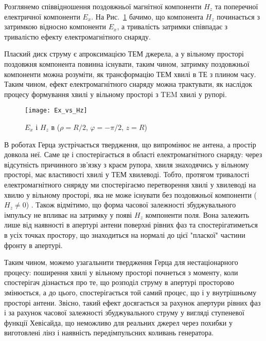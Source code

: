 Розглянемо співвідношення поздовжньої  магнітної компоненти $ H_z $ та 
поперечної електричної компоненти $ E_x $. На Рис.~\ref{fig:ex_vs_hz}
бачимо, що компонента $ H_z $ починається з затримкою відносно компоненти 
$ E_x $, а тривалість затримки співпадає з тривалістю ефекту 
електромагнітного снаряду. 

Плаский диск струму є апроксимацією ТЕМ джерела, а у вільному просторі 
поздовжня компонента повинна існувати, таким чином, затримку поздовжньої 
компоненти можна розуміти, як трансформацію ТЕМ хвилі в ТЕ з плином 
часу. Таким чином, ефект електромагнітного снаряду можна трактувати, як 
наслідок процесу формування хвилі у вільному просторі з TEM хвилі у рупорі.

\begin{figure}[h] \begin{center}
\texttt{[image: Ex\_vs\_Hz]}
\caption{$E_x$ і $H_z$ в ($\rho = R/2$, $\varphi = -\pi/2$, $z = R$)} 
\label{fig:ex_vs_hz}
\end{center} \end{figure}

В роботах Герца \cite{imp:Hertz1938} зустрічається твердження, що 
випромінює не антена, а простір довкола неї. Саме це і спостерігається в 
області електромагнітного снаряду: через відсутність причинного зв'язку з 
краєм рупора, хвиля знаходячись у вільному просторі, має властивості хвилі у 
ТЕМ хвилеводі. Тобто, протягом тривалості електромагнітного сняряду ми 
спостерігаємо перетворення хвилі у хвилеводі на хвилю у вільному просторі, 
яка не може існувати без поздовжньої компоненти ($ H_z \neq 0 $) 
\cite{imp:Borisov1991, imp:Harmuth1985}. Також відмітимо, що форма часової 
залежності збуджувального імпульсу не впливає на затримку у появі $ H_z $
компоненти поля. Вона залежить лише від наявності в апертурі антени
поверхні рівних фаз та спостерігатиметься в усіх точках простору, що 
знаходиться на нормалі до цієї "пласкої" частини фронту в апертурі.

Таким чином, можемо узагальнити твердження Герца для нестаціонарного 
процесу: поширення хвилі у вільному просторі почнеться з моменту, 
коли спостерігач дізнається про те, що розподіл струму в апертурі просторово
змінюється, а до цього, спостерігається той самий процес, що і у 
внутрішньому просторі антени. Звісно, такий ефект досягається за рахунок 
апертури рівних фаз і за рахунок часової залежності збуджувального струму у 
вигляді ступеневої функції Хевісайда, що неможливо для реальних джерел через 
похибки у виготовлені лінз і наявність передімпульсних коливань генератора.

